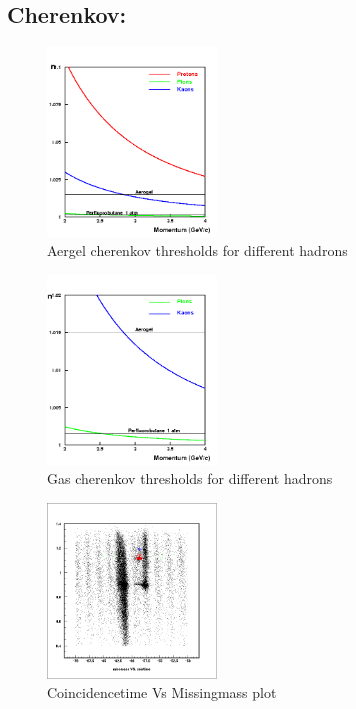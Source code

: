 \documentclass[aps,11pt]{revtex4}
\begin{document}
\newpage
\subsection{Cherenkov:}
\label{sec:Cherenkov:}
\begin{figure}[h]
	\centering
		\includegraphics[width=0.40\textwidth]{pid1.png}
	\caption{Aergel cherenkov thresholds for different hadrons}
	\label{fig:pid1}
\end{figure}
\begin{figure}[h]
	\centering
		\includegraphics[width=0.40\textwidth]{pid2.png}
	\caption{Gas cherenkov thresholds for different hadrons}
	\label{fig:pid2}
\end{figure}

\newpage
\begin{figure}[h]
	\centering
		\includegraphics[width=0.40\textwidth]{coin_miss.png}
	\caption{Coincidencetime Vs Missingmass plot}
	\label{fig:coin_miss}
\end{figure}
\end{document}
